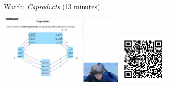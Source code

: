 
\begin{minipage}{10cm}
    \href{https://act4e-spring21.netlify.app/videos/spring2021-coproducts:coproducts.html}{Watch: \emph{Coproducts} (13 minutes).}
        
    \href{https://act4e-spring21.netlify.app/videos/spring2021-coproducts:coproducts.html}{\includegraphics[height=3.5cm]{spring2021-coproducts:coproducts/thumbnails.jpg}}
    \href{https://act4e-spring21.netlify.app/videos/spring2021-coproducts:coproducts.html}{\includegraphics[height=2.5cm]{spring2021-coproducts:coproducts/qrcode.png}}
\end{minipage}

